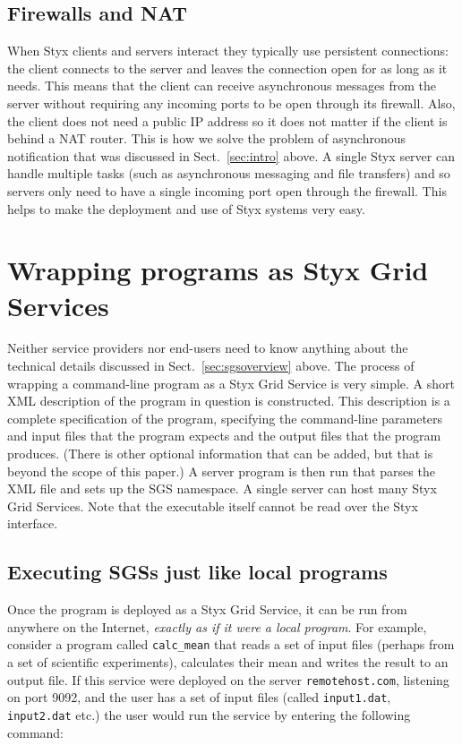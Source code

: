 \documentclass[a4paper]{article}
\begin{document}
\subsection{Firewalls and NAT}\label{sec:styx-firewalls}
When Styx clients and servers interact they typically use persistent connections: the client connects to the server and leaves the connection open for as long as it needs.  This means that the client can receive asynchronous messages from the server without requiring any incoming ports to be open through its firewall.  Also, the client does not need a public IP address so it does not matter if the client is behind a NAT router.  This is how we solve the problem of asynchronous notification that was discussed in Sect.~\ref{sec:intro} above.  A single Styx server can handle multiple tasks (such as asynchronous messaging and file transfers) and so servers only need to have a single incoming port open through the firewall.  This helps to make the deployment and use of Styx systems very easy.


\section{Wrapping programs as Styx Grid Services}\label{sec:wrapping}
Neither service providers nor end-users need to know anything about the technical details discussed in Sect.~\ref{sec:sgsoverview} above.  The process of wrapping a command-line program as a Styx Grid Service is very simple.  A short XML description of the program in question is constructed.  This description is a complete specification of the program, specifying the command-line parameters and input files that the program expects and the output files that the program produces.  (There is other optional information that can be added, but that is beyond the scope of this paper.)  A server program is then run that parses the XML file and sets up the SGS namespace.  A single server can host many Styx Grid Services.  Note that the executable itself cannot be read over the Styx interface.

\subsection{Executing SGSs just like local programs}

Once the program is deployed as a Styx Grid Service, it can be run from anywhere on the Internet, \textit{exactly as if it were a local program\/}.  For example, consider a program called \texttt{calc\_mean} that reads a set of input files (perhaps from a set of scientific experiments), calculates their mean and writes the result to an output file.  If this service were deployed on the server \texttt{remotehost.com}, listening on port 9092, and the user has a set of input files (called \texttt{input1.dat}, \texttt{input2.dat} etc.) the user would run the service by entering the following command:
\end{document}
